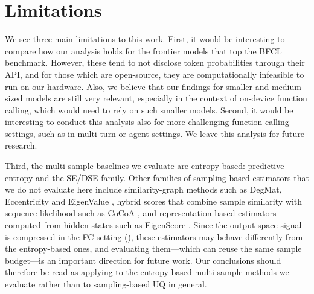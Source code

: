 \section{Limitations}

We see three main limitations to this work. First, it would be interesting to compare how our analysis holds for the frontier models that top the BFCL benchmark. However, these tend to not disclose token probabilities through their API, and for those which are open-source, they are computationally infeasible to run on our hardware. Also, we believe that our findings for smaller and medium-sized models are still very relevant, especially in the context of on-device function calling, which would need to rely on such smaller models.
Second, it would be interesting to conduct this analysis also for more challenging function-calling settings, such as in multi-turn or agent settings. We leave this analysis for future research.

Third, the multi-sample baselines we evaluate are entropy-based: predictive entropy and the SE/DSE family. Other families of sampling-based estimators that we do not evaluate here include similarity-graph methods such as DegMat, Eccentricity and EigenValue \citep{lin2024gener}, hybrid scores that combine sample similarity with sequence likelihood such as CoCoA \citep{vashurin2025uncer}, and representation-based estimators computed from hidden states such as EigenScore \citep{chen2024insid}. Since the output-space signal is compressed in the FC setting (), these estimators may behave differently from the entropy-based ones, and evaluating them---which can reuse the same sample budget---is an important direction for future work. Our conclusions should therefore be read as applying to the entropy-based multi-sample methods we evaluate rather than to sampling-based UQ in general.

